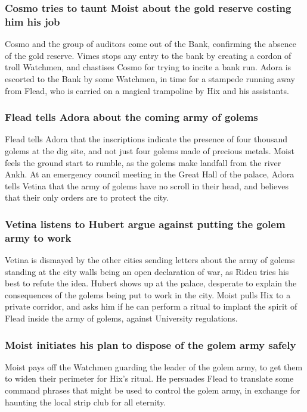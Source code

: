 \subsubsection{\Gls{Cosmo} tries to taunt \Gls{Moist} about the gold reserve costing him his job}
\Gls{Cosmo} and the group of auditors come out of the Bank, confirming the absence of the gold
reserve. \Gls{Vimes} stops any entry to the bank by creating a cordon of troll Watchmen, and
chastises \Gls{Cosmo} for trying to incite a bank run. \Gls{Adora} is escorted to the Bank by some
Watchmen, in time for a stampede running away from \Gls{Flead}, who is carried on a magical
trampoline by \Gls{Hix} and his assistants.

\subsubsection{\Gls{Flead} tells \Gls{Adora} about the coming army of golems}
\Gls{Flead} tells \Gls{Adora} that the inscriptions indicate the presence of four thousand golems
at the dig site, and not just four golems made of precious metals. \Gls{Moist} feels the ground
start to rumble, as the golems make landfall from the river Ankh. At an emergency council meeting
in the Great Hall of the palace, \Gls{Adora} tells \Gls{Vetina} that the army of golems have no
scroll in their head, and believes that their only orders are to protect the city.

\subsubsection{\Gls{Vetina} listens to \Gls{Hubert} argue against putting the golem army to work}
\Gls{Vetina} is dismayed by the other cities sending letters about the army of golems standing at
the city walls being an open declaration of war, as \Gls{Ridcu} tries his best to refute the idea.
\Gls{Hubert} shows up at the palace, desperate to explain the consequences of the golems being put
to work in the city. \Gls{Moist} pulls \Gls{Hix} to a private corridor, and asks him if he can
perform a ritual to implant the spirit of \Gls{Flead} inside the army of golems, against University
regulations.

\subsubsection{\Gls{Moist} initiates his plan to dispose of the golem army safely}
\Gls{Moist} pays off the Watchmen guarding the leader of the golem army, to get them to widen
their perimeter for \Gls{Hix}'s ritual. He persuades \Gls{Flead} to translate some command phrases
that might be used to control the golem army, in exchange for haunting the local strip club for
all eternity.

